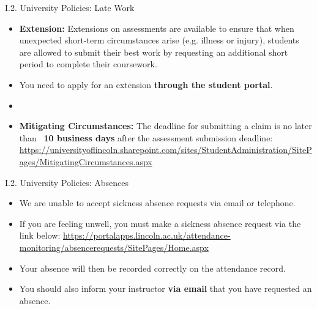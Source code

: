 \documentclass[handout]{beamer}
\newcommand{\strong}[1]{\textbf{\color{teal} #1}}
\newcommand{\stronger}[1]{\textbf{\color{purple} #1}}
\begin{document}
\begin{frame}{I.2. University Policies: Late Work}
\begin{itemize}
\item \strong{Extension:} Extensions on assessments are available to ensure that when unexpected short-term circumstances arise (e.g. illness or injury), students are allowed to submit their best work by requesting an additional short period to complete their coursework.
\item You need to apply for an extension \stronger{through the student portal}.
\item[]
\item \strong{Mitigating Circumstances:} The deadline for submitting a claim is no later than \stronger{10 business days} after the assessment submission deadline:
\url{https://universityoflincoln.sharepoint.com/sites/StudentAdministration/SitePages/MitigatingCircumstances.aspx}
\end{itemize}
\end{frame}
\begin{frame}{I.2. University Policies: Absences}
\begin{itemize}
\item We are unable to accept sickness absence requests via email or telephone. 
\item If you are feeling unwell, you must make a sickness absence request via the link below:
\url{https://portalapps.lincoln.ac.uk/attendance-monitoring/absencerequests/SitePages/Home.aspx}
\item Your absence will then be recorded correctly on the attendance record.
\item You should also inform your instructor \strong{via email} that you have requested an absence.
\end{itemize}
\end{frame}
\end{document}
